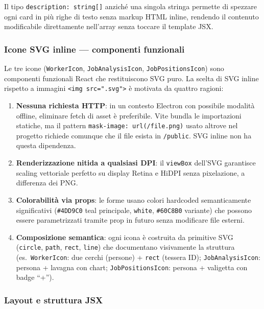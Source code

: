 \documentclass[a4paper,12pt]{article}
\begin{document}
Il tipo \texttt{description: string[]} anzich\'{e} una singola stringa
permette di spezzare ogni card in pi\`{u} righe di testo senza markup
HTML inline, rendendo il contenuto modificabile direttamente nell'array
senza toccare il template JSX.

\subsubsection{Icone SVG inline --- componenti funzionali}

Le tre icone (\texttt{WorkerIcon}, \texttt{JobAnalysisIcon},
\texttt{JobPositionsIcon}) sono componenti funzionali React che
restituiscono SVG puro. La scelta di SVG inline rispetto a immagini
\texttt{<img src=".svg">} \`{e} motivata da quattro ragioni:

\begin{enumerate}
  \item \textbf{Nessuna richiesta HTTP}: in un contesto Electron con
        possibile modalit\`{a} offline, eliminare fetch di asset \`{e}
        preferibile. Vite bundla le importazioni statiche, ma il pattern
        \texttt{mask-image: url(/file.png)} usato altrove nel progetto
        richiede comunque che il file esista in \texttt{/public}.
        SVG inline non ha questa dipendenza.
  \item \textbf{Renderizzazione nitida a qualsiasi DPI}: il \texttt{viewBox}
        dell'SVG garantisce scaling vettoriale perfetto su display Retina
        e HiDPI senza pixelazione, a differenza dei PNG.
  \item \textbf{Colorabilit\`{a} via props}: le forme usano colori hardcoded
        semanticamente significativi (\texttt{\#4DD9C0} teal principale,
        \texttt{white}, \texttt{\#60C8B0} variante) che possono essere
        parametrizzati tramite prop in futuro senza modificare file esterni.
  \item \textbf{Composizione semantica}: ogni icona \`{e} costruita da primitive
        SVG (\texttt{circle}, \texttt{path}, \texttt{rect}, \texttt{line})
        che documentano visivamente la struttura
        (es.\ \texttt{WorkerIcon}: due cerchi (persone) + \texttt{rect}
        (tessera ID); \texttt{JobAnalysisIcon}: persona + lavagna con
        chart; \texttt{JobPositionsIcon}: persona + valigetta con badge ``+'').
\end{enumerate}

\subsubsection{Layout e struttura JSX}
\end{document}
